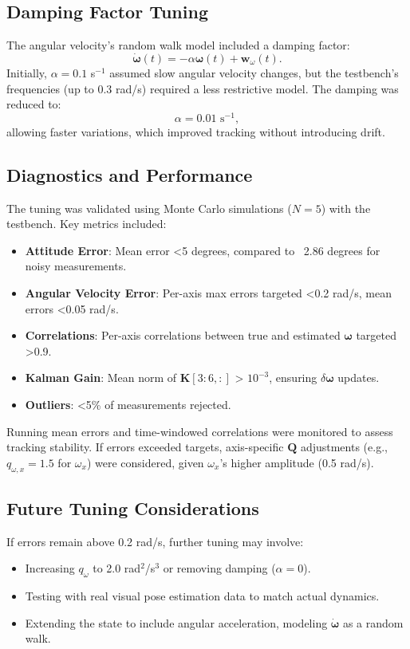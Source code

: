 \documentclass[11pt]{article}
\begin{document}
\subsection{Damping Factor Tuning}
The angular velocity’s random walk model included a damping factor:
\[
\dot{\boldsymbol{\omega}}(t) = -\alpha \boldsymbol{\omega}(t) + \mathbf{w}_{\omega}(t).
\]
Initially, \(\alpha = 0.1\) s\(^{-1}\) assumed slow angular velocity changes, but the testbench’s frequencies (up to 0.3 rad/s) required a less restrictive model. The damping was reduced to:
\[
\alpha = 0.01 \text{ s}^{-1},
\]
allowing faster variations, which improved tracking without introducing drift.

\subsection{Diagnostics and Performance}
The tuning was validated using Monte Carlo simulations (\(N=5\)) with the testbench. Key metrics included:
\begin{itemize}
    \item \textbf{Attitude Error}: Mean error <5 degrees, compared to ~2.86 degrees for noisy measurements.
    \item \textbf{Angular Velocity Error}: Per-axis max errors targeted <0.2 rad/s, mean errors <0.05 rad/s.
    \item \textbf{Correlations}: Per-axis correlations between true and estimated \(\boldsymbol{\omega}\) targeted >0.9.
    \item \textbf{Kalman Gain}: Mean norm of \(\mathbf{K}[3:6, :]\) > \(10^{-3}\), ensuring \(\delta \boldsymbol{\omega}\) updates.
    \item \textbf{Outliers}: <5\% of measurements rejected.
\end{itemize}
Running mean errors and time-windowed correlations were monitored to assess tracking stability. If errors exceeded targets, axis-specific \(\mathbf{Q}\) adjustments (e.g., \(q_{\omega,x} = 1.5\) for \(\omega_x\)) were considered, given \(\omega_x\)’s higher amplitude (0.5 rad/s).

\subsection{Future Tuning Considerations}
If errors remain above 0.2 rad/s, further tuning may involve:
\begin{itemize}
    \item Increasing \(q_{\omega}\) to 2.0 rad\(^2\)/s\(^3\) or removing damping (\(\alpha = 0\)).
    \item Testing with real visual pose estimation data to match actual dynamics.
    \item Extending the state to include angular acceleration, modeling \(\dot{\boldsymbol{\omega}}\) as a random walk.
\end{itemize}
\end{document}
